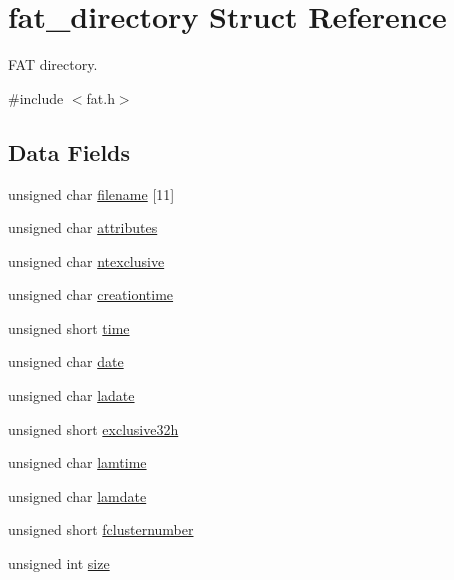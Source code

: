 \hypertarget{structfat__directory}{}\section{fat\+\_\+directory Struct Reference}
\label{structfat__directory}


F\+AT directory.  




{\ttfamily \#include $<$fat.\+h$>$}

\subsection*{Data Fields}
\begin{DoxyCompactItemize}
\item 
unsigned char \hyperlink{structfat__directory_a3aa1ec680c1e61f39705971ebd603064_a3aa1ec680c1e61f39705971ebd603064}{filename} \mbox{[}11\mbox{]}
\item 
unsigned char \hyperlink{structfat__directory_aa516fe54146f6dcb3bdb75721f5f03d0_aa516fe54146f6dcb3bdb75721f5f03d0}{attributes}
\item 
unsigned char \hyperlink{structfat__directory_ad259390d9a31a807cdff543b5b10d9f5_ad259390d9a31a807cdff543b5b10d9f5}{ntexclusive}
\item 
unsigned char \hyperlink{structfat__directory_ab588da02acbe9c2caf2f85828a162fcc_ab588da02acbe9c2caf2f85828a162fcc}{creationtime}
\item 
unsigned short \hyperlink{structfat__directory_a2bfa6f8f103ed1d1ecbab0bc2ed5b650_a2bfa6f8f103ed1d1ecbab0bc2ed5b650}{time}
\item 
unsigned char \hyperlink{structfat__directory_aa80d47ffcb829a15327d9ac115d29e9d_aa80d47ffcb829a15327d9ac115d29e9d}{date}
\item 
unsigned char \hyperlink{structfat__directory_a5dacf198248cb94039288acadd947558_a5dacf198248cb94039288acadd947558}{ladate}
\item 
unsigned short \hyperlink{structfat__directory_a9b2f091174646904538b4b958cfe5ddb_a9b2f091174646904538b4b958cfe5ddb}{exclusive32h}
\item 
unsigned char \hyperlink{structfat__directory_aa010db7b1599af6f1e7ee527219c9f8d_aa010db7b1599af6f1e7ee527219c9f8d}{lamtime}
\item 
unsigned char \hyperlink{structfat__directory_a9aef03a8fc10dd13abe417d792313fc1_a9aef03a8fc10dd13abe417d792313fc1}{lamdate}
\item 
unsigned short \hyperlink{structfat__directory_a67f658abd71861ae6a149238387399e8_a67f658abd71861ae6a149238387399e8}{fclusternumber}
\item 
unsigned int \hyperlink{structfat__directory_a08766899120efa9bd031afe12edad492_a08766899120efa9bd031afe12edad492}{size}
\end{DoxyCompactItemize}


